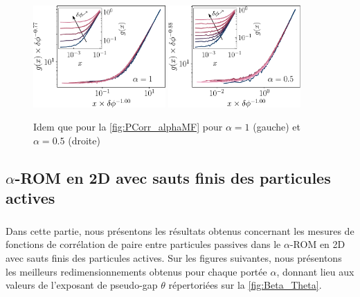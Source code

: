 \begin{figure}[h]
\centering
\includegraphics[width=0.45\textwidth]{Chapitre3/Figures/Interpretation/PCorrMF/PCorr_rescaled_MF_alpha1.pdf}
\includegraphics[width=0.45\textwidth]{Chapitre3/Figures/Interpretation/PCorrMF/PCorr_rescaled_MF_alpha05.pdf}
\caption{Idem que pour la \autoref{fig:PCorr_alphaMF} pour $\alpha = 1$ (gauche) et $\alpha = 0.5$ (droite)}
\label{fig:PCorrAnnexe4}
\end{figure}

\FloatBarrier

\subsection{$\alpha$-ROM en 2D avec sauts finis des particules actives}

\subparagraph{}Dans cette partie, nous présentons les résultats obtenus concernant les mesures de fonctions de corrélation de paire entre particules passives dans le $\alpha$-ROM en 2D avec sauts finis des particules actives. Sur les figures suivantes, nous présentons les meilleurs redimensionnements obtenus pour chaque portée $\alpha$, donnant lieu aux valeurs de l'exposant de pseudo-gap $\theta$ répertoriées sur la \autoref{fig:Beta_Theta}.

